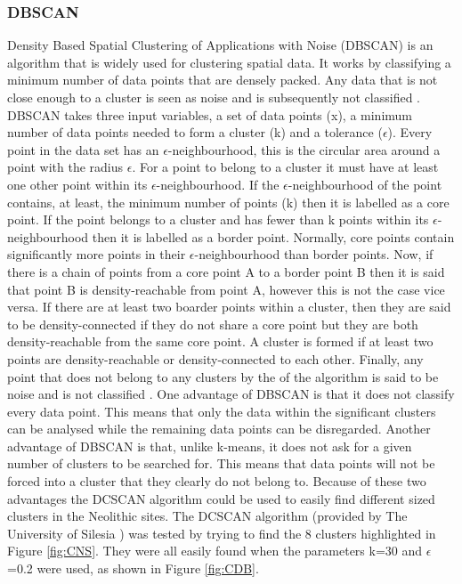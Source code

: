 \documentclass[a4paper]{article}
\begin{document}
\subsubsection{DBSCAN}
Density Based Spatial Clustering of Applications with Noise (DBSCAN) is an algorithm that is widely used for clustering spatial data. It works by classifying a minimum number of data points that are densely packed. Any data that is not close enough to a cluster is seen as noise and is subsequently not classified \cite{DBSCAN}. 
\newline \newline
DBSCAN takes three input variables, a set of data points (x), a minimum number of data points needed to form a cluster (k) and a tolerance ($\epsilon$). Every point in the data set has an $\epsilon$-neighbourhood, this is the circular area around a point with the radius $\epsilon$. For a point to belong to a cluster it must have at least one other point within its $\epsilon$-neighbourhood. If the $\epsilon$-neighbourhood of the point contains, at least, the minimum number of points (k) then it is labelled as a core point. If the point belongs to a cluster and has fewer than k points within its $\epsilon$-neighbourhood then it is labelled as a border point. Normally, core points contain significantly more points in their $\epsilon$-neighbourhood than border points. Now, if there is a chain of points from a core point A to a border point B then it is said that point B is density-reachable from point A, however this is not the case vice versa. If there are at least two boarder points within a cluster, then they are said to be density-connected if they do not share a core point but they are both density-reachable from the same core point. A cluster is formed if at least two points are density-reachable or density-connected to each other. Finally, any point that does not belong to any clusters by the of the algorithm is said to be noise and is not classified \cite{DBSCAN}. 
\newline \newline
One advantage of DBSCAN is that it does not classify every data point. This means that only the data within the significant clusters can be analysed while the remaining data points can be disregarded. Another advantage of DBSCAN is that, unlike k-means, it does not ask for a given number of clusters to be searched for. This means that data points will not be forced into a cluster that they clearly do not belong to. Because of these two advantages the DCSCAN algorithm could be used to easily find different sized clusters in the Neolithic sites. 
\newline \newline
The DCSCAN algorithm (provided by The University of Silesia \cite{DBSCANfunc}) was tested by trying to find the 8 clusters highlighted in Figure \ref{fig:CNS}. They were all easily found when the parameters k=30 and $\epsilon$=0.2 were used, as shown in Figure \ref{fig:CDB}.
\end{document}
